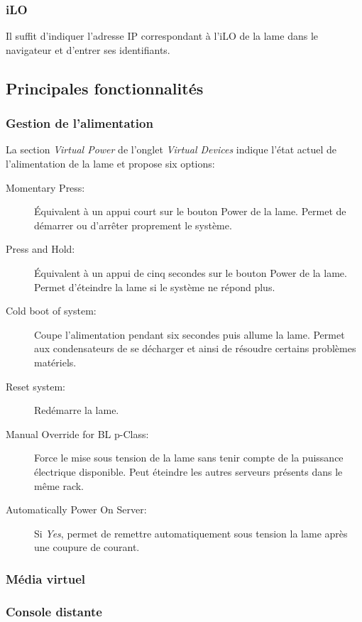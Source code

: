 \documentclass[a4paper,oneside]{report}
\begin{document}
\subsubsection{iLO}
Il suffit d'indiquer l'adresse IP correspondant à l'iLO de la lame dans le navigateur et d'entrer ses identifiants.
\newpage

\subsection{Principales fonctionnalités}
\subsubsection{Gestion de l'alimentation}
La section \emph{Virtual Power} de l'onglet \emph{Virtual Devices} indique l'état actuel de l'alimentation de la lame et propose six options:
\begin{description}
\item[Momentary Press:] Équivalent à un appui court sur le bouton Power de la lame.
Permet de démarrer ou d'arrêter proprement le système.
\item[Press and Hold:] Équivalent à un appui de cinq secondes sur le bouton Power de la lame.
Permet d'éteindre la lame si le système ne répond plus.
\item[Cold boot of system:] Coupe l'alimentation pendant six secondes puis allume la lame.
Permet aux condensateurs de se décharger et ainsi de résoudre certains problèmes matériels.
\item[Reset system:] Redémarre la lame.
\item[Manual Override for BL p-Class:] Force le mise sous tension de la lame sans tenir compte de la puissance électrique disponible.
Peut éteindre les autres serveurs présents dans le même rack.
\item[Automatically Power On Server:] Si \emph{Yes}, permet de remettre automatiquement sous tension la lame après une coupure de courant.
\end{description}

\subsubsection{Média virtuel}

\subsubsection{Console distante}
\end{document}
